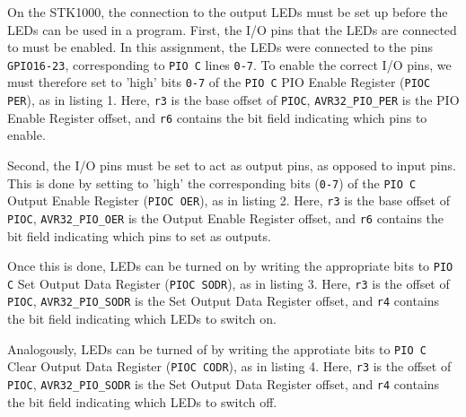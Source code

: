 On the STK1000, the connection to the output LEDs must be set up before the LEDs can be used in a program.
First, the I/O pins that the LEDs are connected to must be enabled.
In this assignment, the LEDs were connected to the pins \texttt{GPIO16-23}, corresponding to \texttt{PIO C} lines \texttt{0-7}.
To enable the correct I/O pins, we must therefore set to 'high' bits \texttt{0-7} of the \texttt{PIO C} PIO Enable Register (\texttt{PIOC PER}), as in listing 1.
Here, \texttt{r3} is the base offset of \texttt{PIOC}, \texttt{AVR32\_PIO\_PER} is the PIO Enable Register offset, and \texttt{r6} contains the bit field indicating which pins to enable.


Second, the I/O pins must be set to act as output pins, as opposed to input pins.
This is done by setting to 'high' the corresponding bits (\texttt{0-7}) of the \texttt{PIO C} Output Enable Register (\texttt{PIOC OER}), as in listing 2.
Here, \texttt{r3} is the base offset of \texttt{PIOC}, \texttt{AVR32\_PIO\_OER} is the Output Enable Register offset, and \texttt{r6} contains the bit field indicating which pins to set as outputs.


Once this is done, LEDs can be turned on by writing the appropriate bits to \texttt{PIO C} Set Output Data Register (\texttt{PIOC SODR}), as in listing 3.
Here, \texttt{r3} is the offset of \texttt{PIOC}, \texttt{AVR32\_PIO\_SODR} is the Set Output Data Register offset, and \texttt{r4} contains the bit field indicating which LEDs to switch on.


Analogously, LEDs can be turned of by writing the approtiate bits to \texttt{PIO C} Clear Output Data Register (\texttt{PIOC CODR}), as in listing 4. 
Here, \texttt{r3} is the offset of \texttt{PIOC}, \texttt{AVR32\_PIO\_SODR} is the Set Output Data Register offset, and \texttt{r4} contains the bit field indicating which LEDs to switch off.

